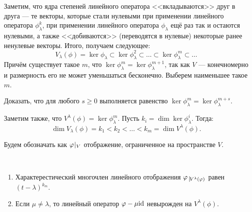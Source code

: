 \vspace{0.2cm}
Заметим, что ядра степеней линейного оператора <<вкладываются>> друг в друга --- те векторы, которые стали нулевыми при применении линейного оператора $\phi^k_\lambda$, при применении линейного оператора $\phi_\lambda$ ещё раз так и остаются нулевыми, а также <<добиваются>> (переводятся в нулевые) некоторые ранее ненулевые векторы. Итого, получаем следующее:
\[
V_\lambda(\phi) = \ker\phi_\lambda \subset \ker\phi^2_\lambda \subset \ldots \subset \ker\phi^m_\lambda 
\subset \ldots
\]
Причём существует такое $m$, что $\ker\phi^m_\lambda = \ker\phi^{m + 1}_\lambda$, так как $V$ --- конечномерно и размерность его не может уменьшаться бесконечно. Выберем наименьшее такое $m$.
\begin{Task}
	Доказать, что для любого $s \geqslant 0$ выполняется равенство $\ker\phi^m_\lambda = \ker\phi^{m + s}_\lambda.$
\end{Task}
Заметим также, что $V^{\lambda}(\phi) = \ker\phi^m_\lambda.$ Пусть $k_i = \dim\ker\phi^i_\lambda$.
Тогда:
 $$ \dim{V_{\lambda}(\phi)} = k_1 < k_2 < \ldots < k_m =  \dim{V^{\lambda}(\phi)}.
 $$
 
 Будем обозначать как ${\varphi}\negmedspace\mid_{V}$ отображение, ограниченное на пространстве $V$.
 
\begin{Suggestion}\
	\begin{enumerate}
		\item Характерестический многочлен линейного отображения $\phi \; \vline_{V^{\lambda}(\phi)}$ равен $(t - \lambda)^{k_m}$.
		\item Если $\mu \neq \lambda$, то линейный оператор $\varphi - \mu \mathrm{id}$ невырожден на  		$V^{\lambda}(\phi)$.
	\end{enumerate}
\end{Suggestion}

